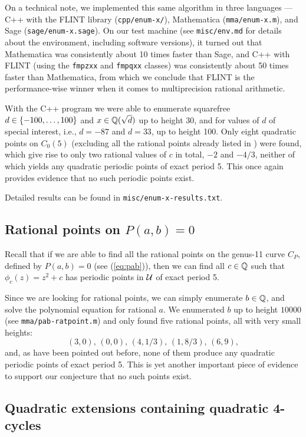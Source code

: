 On a technical note, we implemented this same algorithm in three
languages --- C++ with the FLINT library (\texttt{cpp/enum-x/}),
Mathematica (\texttt{mma/enum-x.m}), and Sage
(\texttt{sage/enum-x.sage}). On our test machine (see
\texttt{misc/env.md} for details about the environment, including
software versions), it turned out that Mathematica was consistently
about 10 times faster than Sage, and C++ with FLINT (using the
\texttt{fmpzxx} and \texttt{fmpqxx} classes) was consistently about 50
times faster than Mathematica, from which we conclude that FLINT is
the performance-wise winner when it comes to multiprecision rational
arithmetic.

With the C++ program we were able to enumerate squarefree $d \in
\left\{-100, \dots, 100\right\}$ and $x \in \mathbb{Q}(\sqrt{d})$ up to height 30, and
for values of $d$ of special interest, i.e., $d = -87$ and $d = 33$,
up to height 100. Only eight quadratic points on $C_0(5)$ (excluding
all the rational points already listed in \cite{MR1480542}) were
found, which give rise to only two rational values of $c$ in total,
$-2$ and $-4/3$, neither of which yields any quadratic periodic points
of exact period 5. This once again provides evidence that no such
periodic points exist.

Detailed results can be found in \texttt{misc/enum-x-results.txt}.

\subsection{Rational points on $P(a, b) = 0$}
\label{subsec:pab-ratpoint}

Recall that if we are able to find all the rational points on the
genus-11 curve $C_P$, defined by $P(a, b) = 0$ (see (\ref{eq:pab})),
then we can find all $c \in \mathbb{Q}$ such that $\phi_c(z) = z^2 + c$ has
periodic points in $\mathcal{U}$ of exact period 5.

Since we are looking for rational points, we can simply enumerate $b
\in \mathbb{Q}$, and solve the polynomial equation for rational $a$. We
enumerated $b$ up to height $10000$ (see \texttt{mma/pab-ratpoint.m})
and only found five rational points, all with very small heights:
\[
(3, 0),\, (0, 0),\, (4, 1/3),\, (1, 8/3),\, (6, 9),
\]
and, as have been pointed out before, none of them produce any
quadratic periodic points of exact period 5. This is yet another
important piece of evidence to support our conjecture that no such
points exist.

\subsection{Quadratic extensions containing quadratic 4-cycles}
\label{subsec:d-distribution}

